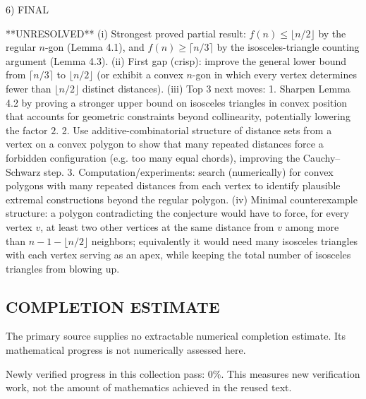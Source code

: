 6) FINAL

**UNRESOLVED**
(i) Strongest proved partial result: $f(n)\le \lfloor n/2\rfloor$ by the regular $n$-gon (Lemma 4.1), and $f(n)\ge \lceil n/3\rceil$ by the isosceles-triangle counting argument (Lemma 4.3).
(ii) First gap (crisp): improve the general lower bound from $\lceil n/3\rceil$ to $\lfloor n/2\rfloor$ (or exhibit a convex $n$-gon in which every vertex determines fewer than $\lfloor n/2\rfloor$ distinct distances).
(iii) Top 3 next moves:
  1. Sharpen Lemma 4.2 by proving a stronger upper bound on isosceles triangles in convex position that accounts for geometric constraints beyond collinearity, potentially lowering the factor $2$.
  2. Use additive-combinatorial structure of distance sets from a vertex on a convex polygon to show that many repeated distances force a forbidden configuration (e.g. too many equal chords), improving the Cauchy--Schwarz step.
  3. Computation/experiments: search (numerically) for convex polygons with many repeated distances from each vertex to identify plausible extremal constructions beyond the regular polygon.
(iv) Minimal counterexample structure: a polygon contradicting the conjecture would have to force, for every vertex $v$, at least two other vertices at the same distance from $v$ among more than $n-1-\lfloor n/2\rfloor$ neighbors; equivalently it would need many isosceles triangles with each vertex serving as an apex, while keeping the total number of isosceles triangles from blowing up.




\subsection*{COMPLETION ESTIMATE}
The primary source supplies no extractable numerical completion estimate. Its mathematical progress is not numerically assessed here.

Newly verified progress in this collection pass: $0\%$. This measures new verification work, not the amount of mathematics achieved in the reused text.
